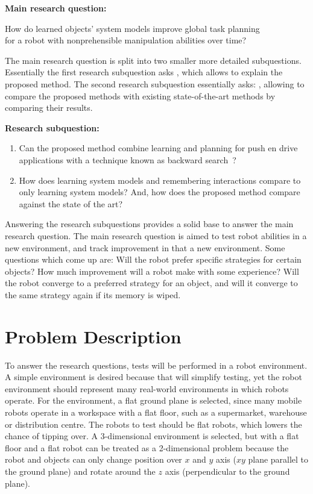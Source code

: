 \textbf{Main research question:}
\begin{center}%
\label{researchquestion:main}
\large
How do learned objects' system models improve global task planning\\for a robot with nonprehensible manipulation abilities over time?
\end{center} 

The main research question is split into two smaller more detailed subquestions. Essentially the first research subquestion asks , which allows to explain the proposed method. The second research subquestion essentially asks: , allowing to compare the proposed methods with existing state-of-the-art methods by comparing their results.\bs

\textbf{Research subquestion:}
\begin{enumerate}
    \item\label{researchsubquestion:does_it_work} Can the proposed method combine learning and planning for push en drive applications with a technique known as backward search~\cite{krontiris_dealing_2015}?
    \item\label{researchsubquestion:does_it_compare} How does learning system models and remembering interactions compare to only learning system models? And, how does the proposed method compare against the state of the art? 
\end{enumerate}

Answering the research subquestions provides a solid base to answer the main research question. The main research question is aimed to test robot abilities in a new environment, and track improvement in that a new environment. Some questions which come up are: Will the robot prefer specific strategies for certain objects? How much improvement will a robot make with some experience? Will the robot converge to a preferred strategy for an object, and will it converge to the same strategy again if its memory is wiped.\bs

\section{Problem Description}%
\label{sec:problem_description}
To answer the research questions, tests will be performed in a robot environment. A simple environment is desired because that will simplify testing, yet the robot environment should represent many real-world environments in which robots operate. For the environment, a flat ground plane is selected, since many mobile robots operate in a workspace with a flat floor, such as a supermarket, warehouse or distribution centre. The robots to test should be flat robots, which lowers the chance of tipping over. A 3-dimensional environment is selected, but with a flat floor and a flat robot can be treated as a 2-dimensional problem because the robot and objects can only change position over $x$ and $y$ axis ($xy$ plane parallel to the ground plane) and rotate around the $z$ axis (perpendicular to the ground plane).\bs

